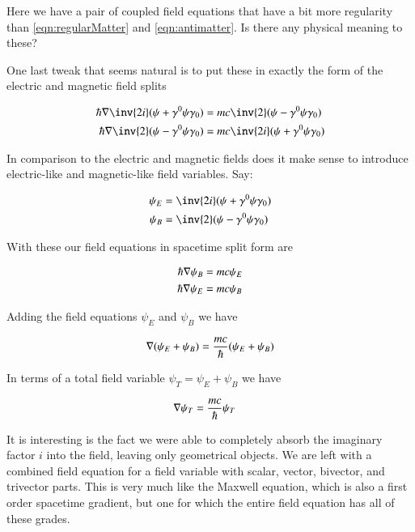 \documentclass{article}
\begin{document}
Here we have a pair of coupled field equations that have a bit more regularity than 
\ref{eqn:regularMatter} and \ref{eqn:antimatter}.  Is there any physical meaning to these?

One last tweak that seems natural is to put these in exactly the form of the electric and magnetic field splits

\begin{align*}
\hbar \grad \inv{2i} (\psi + \gamma^0 \psi \gamma_0) &= m c \inv{2} (\psi -\gamma^0 \psi \gamma_0) \\
\hbar \grad \inv{2} (\psi - \gamma^0 \psi \gamma_0) &= m c \inv{2i} (\psi +\gamma^0 \psi \gamma_0)
\end{align*}

In comparison to the electric and magnetic fields does it make sense to introduce electric-like and magnetic-like field variables.  Say:

\begin{align*}
\psi_E &= \inv{2i} (\psi + \gamma^0 \psi \gamma_0) \\
\psi_B &= \inv{2} (\psi - \gamma^0 \psi \gamma_0)
\end{align*}

With these our field equations in spacetime split form are

\begin{align*}
\hbar \nabla \psi_B &= m c \psi_E \\
\hbar \nabla \psi_E &= m c \psi_B \\
\end{align*}

Adding the field equations $\psi_E$ and $\psi_B$ we have

\begin{align*}
\nabla (\psi_E + \psi_B) &= \frac{m c}{\hbar} (\psi_E + \psi_B) \\ 
\end{align*}

In terms of a total field variable $\psi_T = \psi_E + \psi_B$ we have

\begin{align*}
\nabla \psi_T &= \frac{m c}{\hbar} \psi_T
\end{align*}

It is interesting is the fact we were able to completely absorb the imaginary factor $i$ into the field, leaving only geometrical objects.
We are left with a combined field equation for a field variable with scalar, vector, bivector, and trivector parts.  This is very much like the Maxwell equation, which is
also a first order spacetime gradient, but one for which the entire
field equation has all of these grades.
\end{document}
